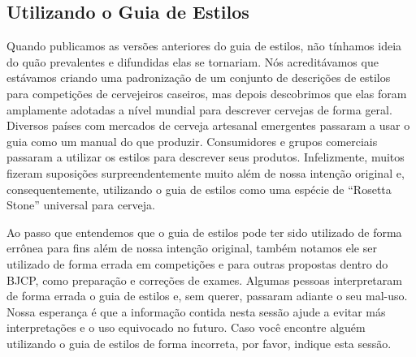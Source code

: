 \subsection*{Utilizando o Guia de Estilos}
Quando publicamos as versões anteriores do guia de estilos, não tínhamos ideia do quão prevalentes e difundidas elas se tornariam. Nós acreditávamos que estávamos criando uma padronização de um conjunto de descrições de estilos para competições de cervejeiros caseiros, mas depois descobrimos que elas foram amplamente adotadas a nível mundial para descrever cervejas de forma geral. Diversos países com mercados de cerveja artesanal emergentes passaram a usar o guia como um manual do que produzir. Consumidores e grupos comerciais passaram a utilizar os estilos para descrever seus produtos. Infelizmente, muitos fizeram suposições surpreendentemente muito além de nossa intenção original e, consequentemente, utilizando o guia de estilos como uma espécie de “Rosetta Stone” universal para cerveja.

Ao passo que entendemos que o guia de estilos pode ter sido utilizado de forma errônea para fins além de nossa intenção original, também notamos ele ser utilizado de forma errada em competições e para outras propostas dentro do BJCP, como preparação e correções de exames. Algumas pessoas interpretaram de forma errada o guia de estilos e, sem querer, passaram adiante o seu mal-uso. Nossa esperança é que a informação contida nesta sessão ajude a evitar más interpretações e o uso equivocado no futuro. Caso você encontre alguém utilizando o guia de estilos de forma incorreta, por favor, indique esta sessão.

